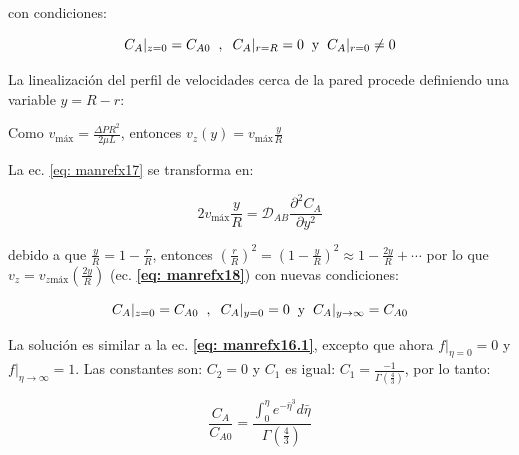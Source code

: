 con condiciones:

\begin{equation}
C_A|_{z=0} = C_{A0} \hspace{0.2cm} , \hspace{0.2cm} C_A|_{r=R} = 0 \hspace{0.2cm} \text{y} \hspace{0.2cm} C_A|_{r=0} \neq 0
\end{equation}

La linealización del perfil de velocidades cerca de la pared procede definiendo una variable $y = R-r$:

Como $v_{\text{máx}} = \frac{\Delta P R^2}{2 \mu L}$, entonces $v_z (y) = v_{\text{máx}} \frac{y}{R} $

La ec. \eqref{eq: manrefx17} se transforma en:

\begin{equation}
	2 v_{\text{máx}} \frac{y}{R} = \mathscr{D}_{AB} \frac{\partial^2 C_A}{\partial y^2}
\end{equation}

debido a que $\frac{y}{R} = 1 - \frac{r}{R}$, entonces $\left( \frac{r}{R} \right)^2 = \left( 1 - \frac{y}{R} \right)^2 \approx 1 - \frac{2 y}{R} + \cdots$ por lo que $v_z = v_{z \text{máx}} (\frac{2y}{R})$ (ec. \textbf{\eqref{eq: manrefx18}}) con nuevas condiciones:

\begin{equation}
C_A|_{z=0} = C_{A0} \hspace{0.2cm} , \hspace{0.2cm} C_A|_{y=0} = 0 \hspace{0.2cm} \text{y} \hspace{0.2cm} C_A|_{y \to \infty} = C_{A0}
\end{equation}

La solución es similar a la ec. \textbf{\eqref{eq: manrefx16.1}}, excepto que ahora $f|_{\eta = 0} = 0$ y \\ $f|_{\eta \to \infty} = 1$. Las constantes son: $C_2 = 0$ y $C_1$ es igual: $C_1 = \frac{-1}{\Gamma (\frac{4}{3})}$, por lo tanto:

\begin{equation}
	\frac{C_A}{C_{A0}} = \frac{\int_0^\eta e^{- \bar{\eta}^3} d \bar{\eta}}{\Gamma (\frac{4}{3})}
\end{equation}
